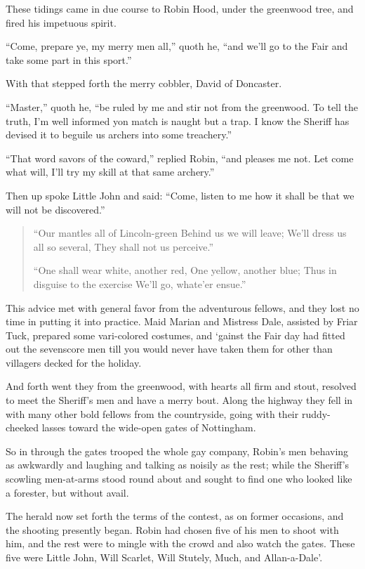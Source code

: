 These tidings came in due course to Robin Hood, under the greenwood
tree, and fired his impetuous spirit.

``Come, prepare ye, my merry men all,'' quoth he, ``and we'll go to the
Fair and take some part in this sport.''

With that stepped forth the merry cobbler, David of Doncaster.

``Master,'' quoth he, ``be ruled by me and stir not from the greenwood.
To tell the truth, I'm well informed yon match is naught but a trap. I
know the Sheriff has devised it to beguile us archers into some
treachery.''

``That word savors of the coward,'' replied Robin, ``and pleases me not.
Let come what will, I'll try my skill at that same archery.''

Then up spoke Little John and said: ``Come, listen to me how it shall be
that we will not be discovered.''

\begin{quote}
“Our mantles all of Lincoln-green
Behind us we will leave;
We’ll dress us all so several,
They shall not us perceive.”

“One shall wear white, another red,
One yellow, another blue;
Thus in disguise to the exercise
We’ll go, whate’er ensue.”
\end{quote}

This advice met with general favor from the adventurous fellows, and
they lost no time in putting it into practice. Maid Marian and Mistress
Dale, assisted by Friar Tuck, prepared some vari-colored costumes, and
`gainst the Fair day had fitted out the sevenscore men till you would
never have taken them for other than villagers decked for the holiday.

And forth went they from the greenwood, with hearts all firm and stout,
resolved to meet the Sheriff's men and have a merry bout. Along the
highway they fell in with many other bold fellows from the countryside,
going with their ruddy-cheeked lasses toward the wide-open gates of
Nottingham.

So in through the gates trooped the whole gay company, Robin's men
behaving as awkwardly and laughing and talking as noisily as the rest;
while the Sheriff's scowling men-at-arms stood round about and sought to
find one who looked like a forester, but without avail.

The herald now set forth the terms of the contest, as on former
occasions, and the shooting presently began. Robin had chosen five of
his men to shoot with him, and the rest were to mingle with the crowd
and also watch the gates. These five were Little John, Will Scarlet,
Will Stutely, Much, and Allan-a-Dale'.

